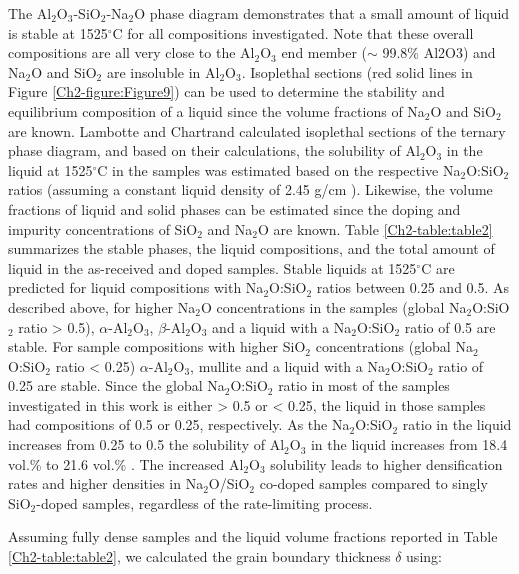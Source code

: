 The Al$_{2}$O$_{3}$-SiO$_{2}$-Na$_{2}$O phase diagram demonstrates that a small amount of liquid is stable at 1525$^{\circ}$C for all compositions investigated. Note that these overall compositions are all very close to the Al$_{2}$O$_{3}$ end member ($\sim$ 99.8\% Al2O3) and Na$_{2}$O and SiO$_{2}$ are insoluble in Al$_{2}$O$_{3}$. Isoplethal sections (red solid lines in Figure \ref{Ch2-figure:Figure9}) can be used to determine the stability and equilibrium composition of a liquid since the volume fractions of Na$_{2}$O and SiO$_{2}$ are known. Lambotte and Chartrand \cite{Lambotte2013a} calculated isoplethal sections of the ternary phase diagram, and based on their calculations, the solubility of Al$_{2}$O$_{3}$ in the liquid at 1525$^{\circ}$C in the samples was estimated based on the respective Na$_{2}$O:SiO$_{2}$ ratios (assuming a constant liquid density of 2.45 g/cm \cite{Standard2013,Day1962}). Likewise, the volume fractions of liquid and solid phases can be estimated since the doping and impurity concentrations of SiO$_{2}$ and Na$_{2}$O are known. Table \ref{Ch2-table:table2} summarizes the stable phases, the liquid compositions, and the total amount of liquid in the as-received and doped samples. Stable liquids at 1525$^{\circ}$C are predicted for liquid compositions with Na$_{2}$O:SiO$_{2}$ ratios between 0.25 and 0.5. As described above, for higher Na$_{2}$O concentrations in the samples (global Na$_{2}$O:SiO$_{2}$ ratio > 0.5), $\alpha$-Al$_{2}$O$_{3}$, $\beta$-Al$_{2}$O$_{3}$ and a liquid with a Na$_{2}$O:SiO$_{2}$ ratio of 0.5 are stable. For sample compositions with higher SiO$_{2}$ concentrations (global Na$_{2}$O:SiO$_{2}$ ratio < 0.25) $\alpha$-Al$_{2}$O$_{3}$, mullite and a liquid with a Na$_{2}$O:SiO$_{2}$ ratio of 0.25 are stable. Since the global Na$_{2}$O:SiO$_{2}$ ratio in most of the samples investigated in this work is either > 0.5 or < 0.25, the liquid in those samples had compositions of 0.5 or 0.25, respectively. As the Na$_{2}$O:SiO$_{2}$ ratio in the liquid increases from 0.25 to 0.5 the solubility of Al$_{2}$O$_{3}$ in the liquid increases from 18.4 vol.\% to 21.6 vol.\% \cite{Lambotte2013a}. The increased Al$_{2}$O$_{3}$ solubility leads to higher densification rates and higher densities in Na$_{2}$O/SiO$_{2}$ co-doped samples compared to singly SiO$_{2}$-doped samples, regardless of the rate-limiting process. 

Assuming fully dense samples and the liquid volume fractions reported in Table \ref{Ch2-table:table2}, we calculated the grain boundary thickness $\delta$ using:

